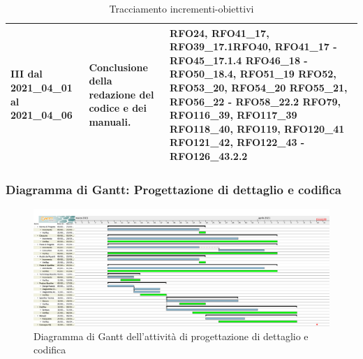 \begin{table}[H]
\begin{center}
\begin{tabular}{ |C{3cm} C{6cm} C{7cm}| }
			III dal 2021\_04\_01 al 2021\_04\_06 	& 
			Conclusione della redazione del codice e dei manuali. & RFO24, RFO41\_17, RFO39\_17.1\newline RFO40,
			RFO41\_17 - RFO45\_17.1.4\newline
			RFO46\_18 - RFO50\_18.4, RFO51\_19 \newline
			RFO52, RFO53\_20, RFO54\_20 \newline
			RFO55\_21, RFO56\_22 - RFO58\_22.2 \newline
			RFO79, RFO116\_39, RFO117\_39 \newline RFO118\_40, RFO119, RFO120\_41 \newline
			RFO121\_42, RFO122\_43 - RFO126\_43.2.2 \\ \hline
		\end{tabular}
		\caption{Tracciamento incrementi-obiettivi}
	\end{center}
\end{table}

\newpage
\subsubsection{Diagramma di Gantt: Progettazione di dettaglio e codifica} \label{GanttPDettaglio}
\begin{figure}[ht]
    \centering
    \includegraphics[width=\textwidth]{Immagini/GanttProgettazioneDiDettaglioECodifica}
    \caption{Diagramma di Gantt dell'attività di progettazione di dettaglio e codifica}
\end{figure}